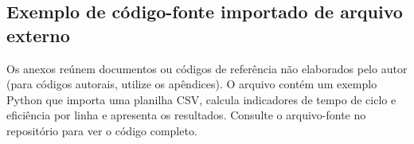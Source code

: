 \begin{anexosenv}
  \chapter{Exemplo de código-fonte importado de arquivo externo}

  Os anexos reúnem documentos ou códigos de referência não elaborados pelo autor (para códigos autorais, utilize os apêndices). O arquivo  contém um exemplo Python que importa uma planilha CSV, calcula indicadores de tempo de ciclo e eficiência por linha e apresenta os resultados. Consulte o arquivo-fonte no repositório para ver o código completo.

\end{anexosenv}
